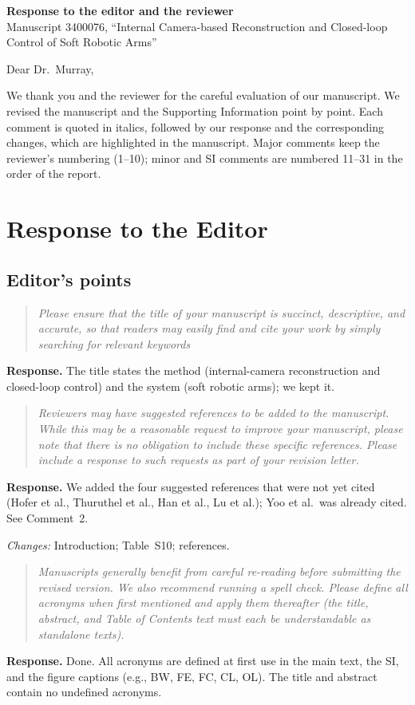 \documentclass[11pt,a4paper]{article}
\newcommand{\rc}[1]{\begin{quote}\color{black!70}\itshape #1\end{quote}}
\begin{document}
{\Large\bfseries Response to the editor and the reviewer}\\[4pt]
Manuscript 3400076, ``Internal Camera-based Reconstruction and Closed-loop Control of Soft Robotic Arms''

Dear Dr.\ Murray,

We thank you and the reviewer for the careful evaluation of our manuscript. We revised the manuscript and the Supporting Information point by point. Each comment is quoted in italics, followed by our response and the corresponding changes, which are highlighted in the manuscript. Major comments keep the reviewer's numbering (1--10); minor and SI comments are numbered 11--31 in the order of the report.


\section*{Response to the Editor}

\subsection*{Editor's points}

\rc{Please ensure that the title of your manuscript is succinct, descriptive, and accurate, so that readers may easily find and cite your work by simply searching for relevant keywords}
\textbf{Response.} The title states the method (internal-camera reconstruction and closed-loop control) and the system (soft robotic arms); we kept it.

\rc{Reviewers may have suggested references to be added to the manuscript. While this may be a reasonable request to improve your manuscript, please note that there is no obligation to include these specific references. Please include a response to such requests as part of your revision letter.}
\textbf{Response.} We added the four suggested references that were not yet cited (Hofer et al., Thuruthel et al., Han et al., Lu et al.); Yoo et al.\ was already cited. See Comment~2.

\textit{Changes:} Introduction; Table~S10; references.

\rc{Manuscripts generally benefit from careful re-reading before submitting the revised version. We also recommend running a spell check. Please define all acronyms when first mentioned and apply them thereafter (the title, abstract, and Table of Contents text must each be understandable as standalone texts).}
\textbf{Response.} Done. All acronyms are defined at first use in the main text, the SI, and the figure captions (e.g., BW, FE, FC, CL, OL). The title and abstract contain no undefined acronyms.
\end{document}
